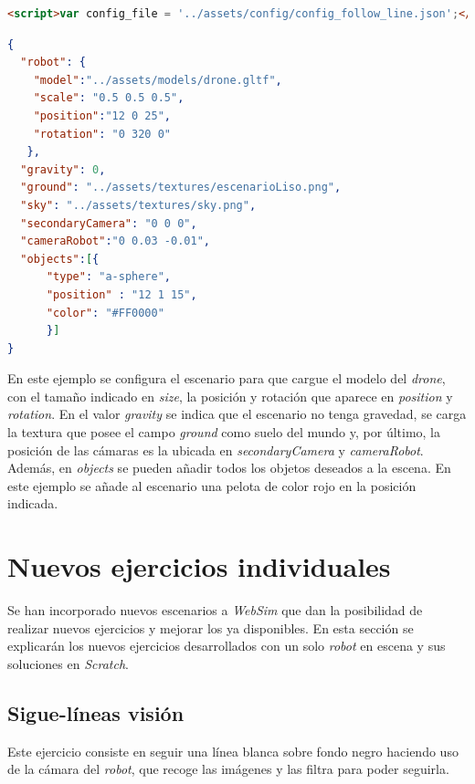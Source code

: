 \begin{lstlisting}[language=html,caption=variable en \textit{HTML} para indicar la ruta del fichero de configuración,label={list:variable}]
    <script>var config_file = '../assets/config/config_follow_line.json';</script>
\end{lstlisting}

\begin{lstlisting}[language=json]
  {
  "robot": {
    "model":"../assets/models/drone.gltf",
    "scale": "0.5 0.5 0.5",
    "position":"12 0 25",
    "rotation": "0 320 0"
   },
  "gravity": 0,
  "ground": "../assets/textures/escenarioLiso.png",
  "sky": "../assets/textures/sky.png",
  "secondaryCamera": "0 0 0",
  "cameraRobot":"0 0.03 -0.01",
  "objects":[{
      "type": "a-sphere",
      "position" : "12 1 15",
      "color": "#FF0000"
      }]
}
\end{lstlisting}

En este ejemplo se configura el escenario para que cargue el modelo del \textit{drone}, con el tamaño indicado en \textit{size}, la posición y rotación que aparece en \textit{position} y \textit{rotation}. En el valor \textit{gravity} se indica que el escenario no tenga gravedad, se carga la textura que posee el campo \textit{ground} como suelo del mundo y, por último, la posición de las cámaras es la ubicada en \textit{secondaryCamera} y \textit{cameraRobot}. Además, en \textit{objects} se pueden añadir todos los objetos deseados a la escena. En este ejemplo se añade al escenario una pelota de color rojo en la posición indicada.


\section{Nuevos ejercicios individuales}
\label{sec:escenarios}

Se han incorporado nuevos escenarios a \textit{WebSim} que dan la posibilidad de realizar nuevos ejercicios y mejorar los ya disponibles. En esta sección se explicarán los nuevos ejercicios desarrollados con un solo \textit{robot} en escena y sus soluciones en \textit{Scratch}.

\subsection{Sigue-líneas visión}
    Este ejercicio consiste en seguir una línea blanca sobre fondo negro haciendo uso de la cámara del \textit{robot}, que recoge las imágenes y las filtra para poder seguirla.
    

